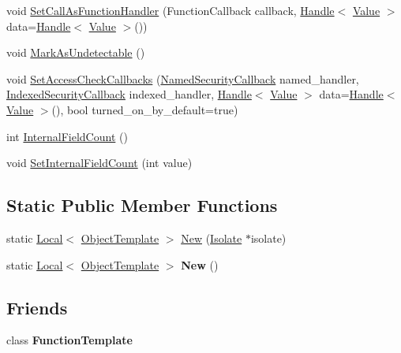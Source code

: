 \begin{DoxyCompactItemize}
\item 
void \hyperlink{classv8_1_1_object_template_a5a7c6acbee1a04deb7c2cd43896b34ac}{Set\+Call\+As\+Function\+Handler} (Function\+Callback callback, \hyperlink{classv8_1_1_handle}{Handle}$<$ \hyperlink{classv8_1_1_value}{Value} $>$ data=\hyperlink{classv8_1_1_handle}{Handle}$<$ \hyperlink{classv8_1_1_value}{Value} $>$())
\item 
void \hyperlink{classv8_1_1_object_template_a7e40ef313b44c2ad336c73051523b4f8}{Mark\+As\+Undetectable} ()
\item 
void \hyperlink{classv8_1_1_object_template_acd0c47ecc715fa1256dc95524a4e8608}{Set\+Access\+Check\+Callbacks} (\hyperlink{namespacev8_ab5cafda0c556bba990c660ce9c904e0d}{Named\+Security\+Callback} named\+\_\+handler, \hyperlink{namespacev8_aebbcc7837753e51112d944ad96520da1}{Indexed\+Security\+Callback} indexed\+\_\+handler, \hyperlink{classv8_1_1_handle}{Handle}$<$ \hyperlink{classv8_1_1_value}{Value} $>$ data=\hyperlink{classv8_1_1_handle}{Handle}$<$ \hyperlink{classv8_1_1_value}{Value} $>$(), bool turned\+\_\+on\+\_\+by\+\_\+default=true)
\item 
int \hyperlink{classv8_1_1_object_template_a43de785d594d8c01b18230b1aa79e31c}{Internal\+Field\+Count} ()
\item 
void \hyperlink{classv8_1_1_object_template_ab63916ac584a76bca8ba541f86ce9fce}{Set\+Internal\+Field\+Count} (int value)
\end{DoxyCompactItemize}
\subsection*{Static Public Member Functions}
\begin{DoxyCompactItemize}
\item 
static \hyperlink{classv8_1_1_local}{Local}$<$ \hyperlink{classv8_1_1_object_template}{Object\+Template} $>$ \hyperlink{classv8_1_1_object_template_a2b5c18f57d24b4cfea00dd752ee78c86}{New} (\hyperlink{classv8_1_1_isolate}{Isolate} $\ast$isolate)
\item 
\hypertarget{classv8_1_1_object_template_a394801526a9e9eb6df349a0eb8dfa0d0}{}static \hyperlink{classv8_1_1_local}{Local}$<$ \hyperlink{classv8_1_1_object_template}{Object\+Template} $>$ {\bfseries New} ()\label{classv8_1_1_object_template_a394801526a9e9eb6df349a0eb8dfa0d0}

\end{DoxyCompactItemize}
\subsection*{Friends}
\begin{DoxyCompactItemize}
\item 
\hypertarget{classv8_1_1_object_template_a334168ad1a5f39cf17b818ca3356aacd}{}class {\bfseries Function\+Template}\label{classv8_1_1_object_template_a334168ad1a5f39cf17b818ca3356aacd}

\end{DoxyCompactItemize}


